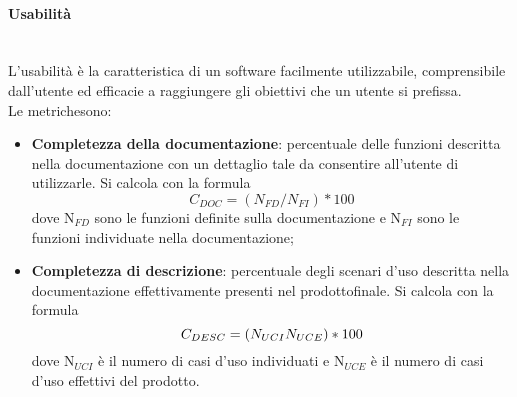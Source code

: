 	\paragraph{Usabilità} \mbox{}\\[1mm]
	L'usabilità è la caratteristica di un software facilmente utilizzabile, comprensibile dall'utente ed efficacie a raggiungere gli obiettivi che un utente si prefissa.\\
	Le metriche\glosp sono:
	\begin{itemize}
		\item \textbf{Completezza della documentazione}: percentuale delle funzioni descritta nella documentazione con un dettaglio tale da consentire all'utente di utilizzarle. Si calcola con la formula
		\[C_{DOC}=(N_{FD}/N_{FI})*100\]
		dove N$_{FD}$ sono le funzioni definite sulla documentazione e N$_{FI}$ sono le funzioni individuate nella documentazione;
		\item \textbf{Completezza di descrizione}: percentuale degli scenari d’uso descritta nella documentazione effettivamente presenti nel prodotto\glosp finale. Si calcola con la formula
		\[C_{DESC}=(N_{UCI}\\N_{UCE})*100\]
		dove N$_{UCI}$ è il numero di casi d'uso individuati e N$_{UCE}$ è il numero di casi d'uso effettivi del prodotto\glo.
	\end{itemize}

